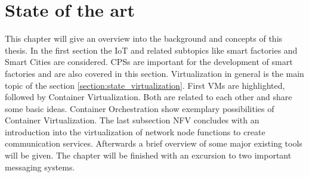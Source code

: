 


\chapter{State of the art}
\label{chapter:state-of-the-art}
\minitoc\vspace{.5cm}

This chapter will give an overview into the background and concepts of this thesis.
In the first section the \ac{IoT} and related subtopics like smart factories and Smart Cities are considered.
\acp{CPS} are important for the development of smart factories and are also covered in this section.
Virtualization in general is the main topic of the section \ref{section:state_virtualization}.
First \acp{VM} are highlighted, followed by Container Virtualization.
Both are related to each other and share some basic ideas.
Container Orchestration show exemplary possibilities of Container Virtualization.
The last subsection \ac{NFV} concludes with an introduction into the virtualization of network node functions to create communication services.
Afterwards a brief overview of some major existing tools will be given.
The chapter will be finished with an excursion to two important messaging systems.


